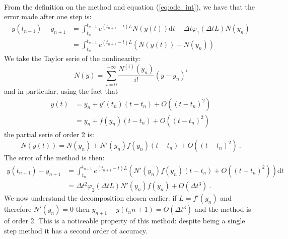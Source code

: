       \paragraph{}
      From the definition on the method and equation (\ref{eq:ode_int}), we have that the error made after one step is:
      \begin{equation}
        \begin{aligned}
          y\left(t_{n+1}\right) - y_{n+1} &= \int_{t_n}^{t_{n+1}} e^{\left(t_{n+1} - t\right) L} N\left(y\left(t\right)\right) \mathrm{d}t  - \Delta t \varphi_1\left(\Delta t L\right) N\left(y_n\right) \\
          &= \int_{t_n}^{t_{n+1}} e^{\left(t_{n+1} - t\right) L} \left( N\left(y\left(t\right)\right) - N\left(y_n\right) \right)
        \end{aligned}
      \end{equation}
      We take the Taylor serie of the nonlinearity:
      \begin{equation}
        N\left(y\right) = \sum_{i = 0}^{+\infty} \frac{N^{\left(i\right)}\left(y_n\right)}{i!}\left(y - y_n\right)^i
      \end{equation}
      and in particular, using the fact that
      \begin{equation}
        \begin{aligned}
          y\left(t\right) &= y_n + y'\left(t_n\right)\left(t - t_n\right) + O\left(\left(t - t_n\right)^2\right) \\
          & = y_n + f\left(y_n\right)\left(t - t_n\right) + O\left(\left(t - t_n\right)^2\right)
        \end{aligned}
      \end{equation}
      the partial serie of order 2 is:
      \begin{equation}
        N\left(y\left(t\right)\right) = N\left(y_n\right) + N'\left(y_n\right)f\left(y_n\right)\left(t - t_n\right) + O\left(\left(t - t_n\right)^2\right) \ .
      \end{equation}
      The error of the method is then:
      \begin{equation}
        \begin{aligned}
          y\left(t_{n+1}\right) - y_{n+1} &= \int_{t_n}^{t_{n+1}} e^{\left(t_{n+1} - t\right) L} \left( N'\left(y_n\right)f\left(y_n\right)\left(t - t_n\right) + O\left(\left(t - t_n\right)^2\right) \right) \mathrm{d}t \\
          &= \Delta t^2\varphi_2\left(\Delta t L\right) N'\left(y_n\right)f\left(y_n\right) + O\left(\Delta t^3\right) \ .
        \end{aligned}
      \end{equation}
      We now understand the decomposition chosen earlier: if $L = f'\left(y_n\right)$ and therefore $N'\left(y_n\right) = 0$ then $y_{n+1} - y\left(t_n{n+1}\right) = O\left(\Delta t^3\right)$ and the method is of order 2.
      This is a noticeable property of this method: despite being a single step method it has a second order of accuracy.

